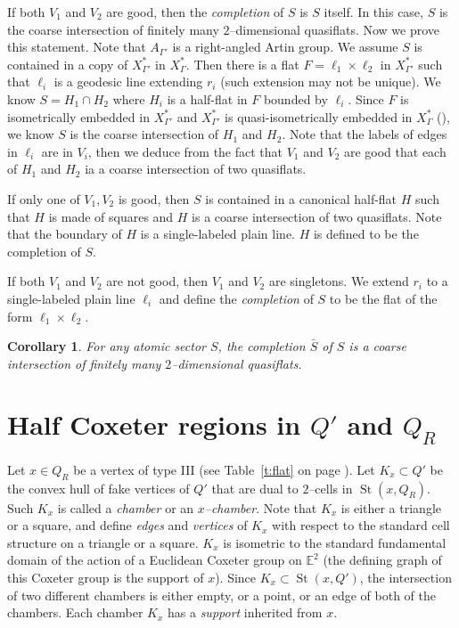 \documentclass[11pt]{amsart}
\newcommand{\St}{\operatorname{St}}
\newtheorem{corollary}[theorem]{Corollary}
\theoremstyle{definition}
\newcommand{\Xa}{X^{\ast}}
\begin{document}
If both $V_1$ and $V_2$ are good, then the \emph{completion} of $S$ is $S$ itself. In this case, $S$ is the coarse intersection of finitely many $2$--dimensional quasiflats. Now we prove this statement. Note that $A_{\Gamma'}$ is a right-angled Artin group. We assume $S$ is contained in a copy of $\Xa_{\Gamma'}$ in $\Xa_{\Gamma}$. Then there is a flat $F=\ell_1\times \ell_2$ in $\Xa_{\Gamma'}$ such that $\ell_i$ is a geodesic line extending $r_i$ (such extension may not be unique). We know $S=H_1\cap H_2$ where $H_i$ is a half-flat in $F$ bounded by $\ell_i$. Since $F$ is isometrically embedded in $\Xa_{\Gamma'}$ and $\Xa_{\Gamma'}$ is quasi-isometrically embedded in $\Xa_{\Gamma}$ (\cite[Theorem 1.2]{charney2014convexity}), we know $S$ is the coarse intersection of $H_1$ and $H_2$. Note that the labels of edges in $\ell_i$ are in $V_i$, then we deduce from the fact that $V_1$ and $V_2$ are good that each of $H_1$ and $H_2$ ia a coarse intersection of two quasiflats. 

If only one of $V_1, V_2$ is good, then $S$ is contained in a canonical half-flat $H$ such that $H$ is made of squares and $H$ is a coarse intersection of two quasiflats. Note that the boundary of $H$ is a single-labeled plain line. $H$ is defined to be the completion of $S$. 

If both $V_1$ and $V_2$ are not good, then $V_1$ and $V_2$ are singletons. We extend $r_i$ to a single-labeled plain line $\ell_i$ and define the \emph{completion} of $S$ to be the flat of the form $\ell_1\times\ell_2$.

\begin{corollary}
	\label{cor:completion of atomic}
For any atomic sector $S$, the completion $\bar S$ of $S$ is a coarse intersection of finitely many $2$--dimensional quasiflats.
\end{corollary}

\section{Half Coxeter regions in $Q'$ and $Q_R$}
\label{sec:half coxeter regions}
Let $x\in Q_R$ be a vertex of type III (see Table~\ref{t:flat} on page \pageref{t:flat}). Let $K_x\subset Q'$ be the convex hull of fake vertices of $Q'$ that are dual to $2$--cells in $\St(x,Q_R)$. Such $K_x$ is called a \emph{chamber} or an \emph{$x$--chamber}. Note that $K_x$ is either a triangle or a square, and define \emph{edges} and \emph{vertices} of $K_x$ with respect to the standard cell structure on a triangle or a square. $K_x$ is isometric to the standard fundamental domain of the action of a Euclidean Coxeter group on $\mathbb E^2$ (the defining graph of this Coxeter group is the support of $x$).  Since $K_x\subset \St(x,Q')$, the intersection of two different chambers is either empty, or a point, or an edge of both of the chambers. Each chamber $K_x$ has a \emph{support} inherited from $x$.
\end{document}
